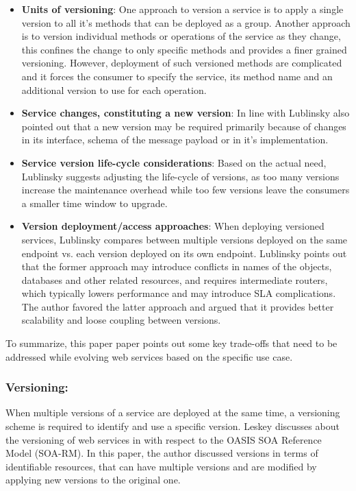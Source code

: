 \documentclass[runningheads,a4paper]{llncs}
\begin{document}
\begin{itemize}

  \item \textbf{Units of versioning}: One approach to version a service is to apply a single version to all it’s methods that can be deployed as a group. Another approach is to version individual methods or operations of the service as they change, this confines the change to only specific methods and provides a finer grained versioning. However, deployment of such versioned methods are complicated and it forces the consumer to specify the service, its method name and an additional version to use for each operation.
  \item \textbf{Service changes, constituting a new version}: In line with \cite{treiber2009analyzing}  Lublinsky also pointed out that a new version may be required primarily because of changes in its interface, schema of the message payload or in it’s implementation.
  \item \textbf{Service version life-cycle considerations}: Based on the actual need, Lublinsky suggests adjusting the life-cycle of versions, as too many versions increase the maintenance overhead while too few versions leave the consumers a smaller time window to upgrade.
  \item \textbf{Version deployment/access approaches}: When deploying versioned services, Lublinsky compares between multiple versions deployed on the same endpoint vs. each version deployed on its own endpoint. Lublinsky points out that the former approach may introduce conflicts in names of the objects, databases and other related resources, and requires intermediate routers, which typically lowers performance and may introduce SLA complications. The author favored the latter approach and argued that it provides better scalability and loose coupling between versions.

\end{itemize}

To summarize, this paper paper points out some key trade-offs that need to be addressed while evolving web services based on the specific use case.

\subsubsection{Versioning:}
When multiple versions of a service are deployed at the same time, a versioning scheme is required to identify and use a specific version. Leskey discusses about the versioning of web services in \cite{laskey2008considerations} with respect to the OASIS SOA Reference Model (SOA-RM). In this paper, the author discussed versions in terms of identifiable resources, that can have multiple versions and are modified by applying new versions to the original one.
\end{document}
